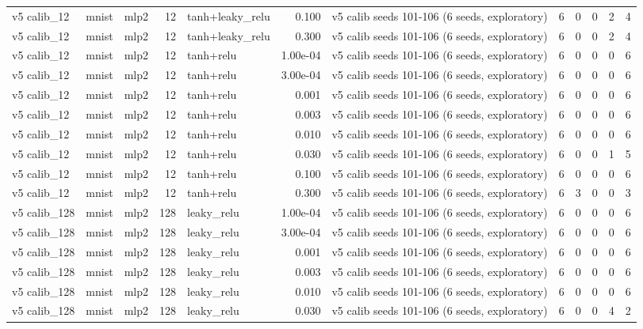 \begin{table}[htbp]
{\begin{tabular}{@{}lllrlrlrrrrr@{}}
v5 calib\_12 & mnist & mlp2 & 12 & tanh+leaky\_relu & 0.100 & v5 calib seeds 101-106 (6 seeds, exploratory) & 6 & 0 & 0 & 2 & 4 \\
v5 calib\_12 & mnist & mlp2 & 12 & tanh+leaky\_relu & 0.300 & v5 calib seeds 101-106 (6 seeds, exploratory) & 6 & 0 & 0 & 2 & 4 \\
v5 calib\_12 & mnist & mlp2 & 12 & tanh+relu & 1.00e-04 & v5 calib seeds 101-106 (6 seeds, exploratory) & 6 & 0 & 0 & 0 & 6 \\
v5 calib\_12 & mnist & mlp2 & 12 & tanh+relu & 3.00e-04 & v5 calib seeds 101-106 (6 seeds, exploratory) & 6 & 0 & 0 & 0 & 6 \\
v5 calib\_12 & mnist & mlp2 & 12 & tanh+relu & 0.001 & v5 calib seeds 101-106 (6 seeds, exploratory) & 6 & 0 & 0 & 0 & 6 \\
v5 calib\_12 & mnist & mlp2 & 12 & tanh+relu & 0.003 & v5 calib seeds 101-106 (6 seeds, exploratory) & 6 & 0 & 0 & 0 & 6 \\
v5 calib\_12 & mnist & mlp2 & 12 & tanh+relu & 0.010 & v5 calib seeds 101-106 (6 seeds, exploratory) & 6 & 0 & 0 & 0 & 6 \\
v5 calib\_12 & mnist & mlp2 & 12 & tanh+relu & 0.030 & v5 calib seeds 101-106 (6 seeds, exploratory) & 6 & 0 & 0 & 1 & 5 \\
v5 calib\_12 & mnist & mlp2 & 12 & tanh+relu & 0.100 & v5 calib seeds 101-106 (6 seeds, exploratory) & 6 & 0 & 0 & 0 & 6 \\
v5 calib\_12 & mnist & mlp2 & 12 & tanh+relu & 0.300 & v5 calib seeds 101-106 (6 seeds, exploratory) & 6 & 3 & 0 & 0 & 3 \\
v5 calib\_128 & mnist & mlp2 & 128 & leaky\_relu & 1.00e-04 & v5 calib seeds 101-106 (6 seeds, exploratory) & 6 & 0 & 0 & 0 & 6 \\
v5 calib\_128 & mnist & mlp2 & 128 & leaky\_relu & 3.00e-04 & v5 calib seeds 101-106 (6 seeds, exploratory) & 6 & 0 & 0 & 0 & 6 \\
v5 calib\_128 & mnist & mlp2 & 128 & leaky\_relu & 0.001 & v5 calib seeds 101-106 (6 seeds, exploratory) & 6 & 0 & 0 & 0 & 6 \\
v5 calib\_128 & mnist & mlp2 & 128 & leaky\_relu & 0.003 & v5 calib seeds 101-106 (6 seeds, exploratory) & 6 & 0 & 0 & 0 & 6 \\
v5 calib\_128 & mnist & mlp2 & 128 & leaky\_relu & 0.010 & v5 calib seeds 101-106 (6 seeds, exploratory) & 6 & 0 & 0 & 0 & 6 \\
v5 calib\_128 & mnist & mlp2 & 128 & leaky\_relu & 0.030 & v5 calib seeds 101-106 (6 seeds, exploratory) & 6 & 0 & 0 & 4 & 2 \\

\end{tabular}}
\end{table}
